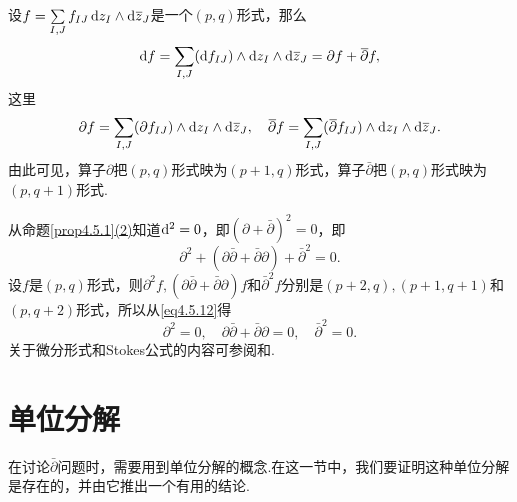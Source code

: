 设$f=\sum\limits_{I,J}f_{IJ}\mathop{}\!\mathrm dz_I\wedge\mathop{}\!\mathrm d{}\mkern1mu\overline{\mkern-1muz}_J$是一个$(p,q)$形式，那么
\[\mathop{}\!\mathrm{d} f=\sum_{I,J}(\mathop{}\!\mathrm{d} f_{IJ})\wedge\mathop{}\!\mathrm dz_I\wedge\mathop{}\!\mathrm d{}\mkern1mu\overline{\mkern-1muz}_J=\partial f+{}\mkern1mu\overline{\mkern-1mu\partial}f,\]
这里
\[\partial f=\sum_{I,J}(\partial f_{IJ})\wedge\mathop{}\!\mathrm dz_I\wedge\mathop{}\!\mathrm d{}\mkern1mu\overline{\mkern-1muz}_J,\quad{}\mkern1mu\overline{\mkern-1mu\partial}f=\sum_{I,J}({}\mkern1mu\overline{\mkern-1mu\partial}f_{IJ})\wedge\mathop{}\!\mathrm dz_I\wedge\mathop{}\!\mathrm d{}\mkern1mu\overline{\mkern-1muz}_J.\]
由此可见，算子$\partial$把$(p,q)$形式映为$(p+1,q)$形式，算子$\bar{\partial}$把$(p,q)$形式映为$(p,q+1)$形式.

从命题\ref{prop4.5.1}\hyperlink{4.5.1}{(2)}知道$\mathop{}\!\mathrm{d}^2=0$，即$(\partial+\bar{\partial})^2=0$，即
\begin{equation}\label{eq4.5.12}
	\partial^2+(\partial\bar{\partial}+\bar{\partial}\partial)+\bar{\partial}^2=0.
\end{equation}
设$f$是$(p,q)$形式，则$\partial^2 f,(\partial\bar{\partial}+\bar{\partial}\partial)f$和$\bar{\partial}^2 f$分别是$(p+2,q),(p+1,q+1)$和$(p,q+2)$形式，所以从\eqref{eq4.5.12}得
\begin{equation}\label{eq4.5.13}
	\partial^2=0,\quad \partial\bar{\partial}+\bar{\partial}\partial=0,\quad \bar{\partial}^2=0.
\end{equation}
关于微分形式和Stokes公式的内容可参阅\cite{徐森林1981流形}和\cite{rudin1976principles}.
\section{单位分解\label{sec4.6}}
在讨论$\bar{\partial}$问题时，需要用到单位分解的概念.在这一节中，我们要证明这种单位分解是存在的，并由它推出一个有用的结论.

